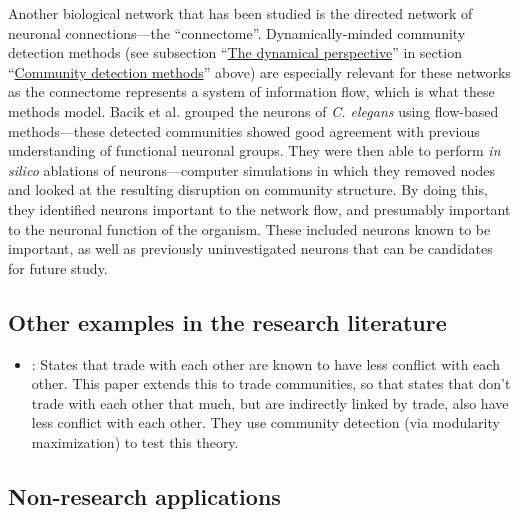 Another biological network that has been studied is the directed network
of neuronal connections---the ``connectome''. Dynamically-minded
community detection methods (see subsection
``\protect\hyperlink{the-dynamical-perspective}{The dynamical
perspective}'' in section
``\protect\hyperlink{community-detection-methods}{Community detection
methods}'' above) are especially relevant for these networks as the
connectome represents a system of information flow, which is what these
methods model. Bacik et al. \autocite{bacik_flow-based_2016} grouped the
neurons of \emph{C. elegans} using flow-based methods---these detected
communities showed good agreement with previous understanding of
functional neuronal groups. They were then able to perform \emph{in
silico} ablations of neurons---computer simulations in which they
removed nodes and looked at the resulting disruption on community
structure. By doing this, they identified neurons important to the
network flow, and presumably important to the neuronal function of the
organism. These included neurons known to be important, as well as
previously uninvestigated neurons that can be candidates for future
study.


\hypertarget{other-research}{\subsection{Other examples in the research
literature}\label{other-research}}


\begin{itemize}
\tightlist
\item
  \autocite{lupu_trading_2013}: States that trade with each other are
  known to have less conflict with each other. This paper extends this
  to trade communities, so that states that don't trade with each other
  that much, but are indirectly linked by trade, also have less conflict
  with each other. They use community detection (via modularity
  maximization) to test this theory.
\end{itemize}


\subsection{Non-research applications}\label{non-research-applications}

